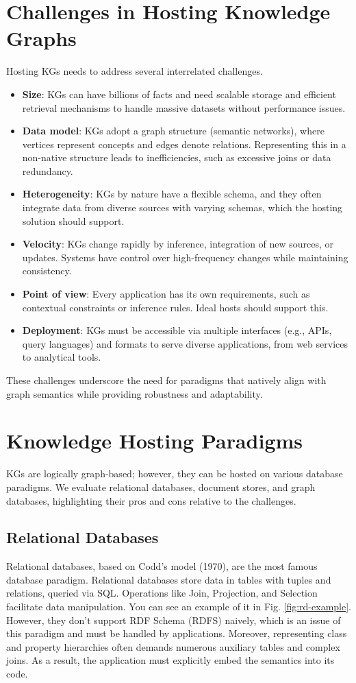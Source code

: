 \documentclass[12pt]{article}
\begin{document}
\section{Challenges in Hosting Knowledge Graphs}
Hosting KGs needs to address several interrelated challenges.
\begin{itemize}
    \item \textbf{Size}: KGs can have billions of facts and need scalable storage and efficient retrieval mechanisms to handle massive datasets without performance issues.
    \item \textbf{Data model}: KGs adopt a graph structure (semantic networks), where vertices represent concepts and edges denote relations. Representing this in a non-native structure leads to inefficiencies, such as excessive joins or data redundancy.
    \item \textbf{Heterogeneity}: KGs by nature have a flexible schema, and they often integrate data from diverse sources with varying schemas, which the hosting solution should support.
    \item \textbf{Velocity}: KGs change rapidly by inference, integration of new sources, or updates. Systems have control over high-frequency changes while maintaining consistency.
    \item \textbf{Point of view}: Every application has its own requirements, such as contextual constraints or inference rules. Ideal hosts should support this.
    \item \textbf{Deployment}: KGs must be accessible via multiple interfaces (e.g., APIs, query languages) and formats to serve diverse applications, from web services to analytical tools.

\end{itemize}
These challenges underscore the need for paradigms that natively align with graph semantics while providing robustness and adaptability.
\section{Knowledge Hosting Paradigms}
KGs are logically graph-based; however, they can be hosted on various database paradigms. We evaluate relational databases, document stores, and graph databases, highlighting their pros and cons relative to the challenges.
\subsection{Relational Databases}
Relational databases, based on Codd's model (1970), are the most famous database paradigm. Relational databases store data in tables with tuples and relations, queried via SQL. Operations like Join, Projection, and Selection facilitate data manipulation. You can see an example of it in Fig. \ref{fig:rd-example}. However, they don’t support RDF Schema (RDFS) naively, which is an issue of this paradigm and must be handled by applications. Moreover, representing class and property hierarchies often demands numerous auxiliary tables and complex joins. As a result, the application must explicitly embed the semantics into its code.
\end{document}
